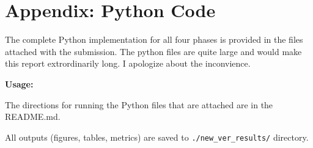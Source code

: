 \documentclass[stu,12pt,floatsintext]{apa7}
\begin{document}
\section{Appendix: Python Code}

The complete Python implementation for all four phases is provided in the files attached with the submission. The python files are quite large 
and would make this report extrordinarily long. I apologize about the inconvience.

\textbf{Usage:}

The directions for running the Python files that are attached are in the README.md.

All outputs (figures, tables, metrics) are saved to \texttt{./new\_ver\_results/} directory.
\end{document}
